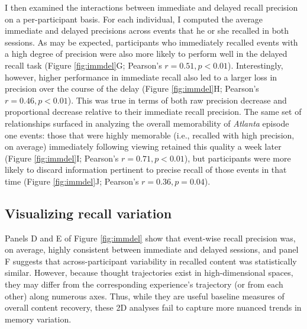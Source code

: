 \documentclass{article}
\begin{document}
I then examined the interactions between immediate and delayed recall precision on a per-participant basis.  For each individual, I computed the average immediate and delayed precisions across events that he or she recalled in both sessions.  As may be expected, participants who immediately recalled events with a high degree of precision were also more likely to perform well in the delayed recall task (Figure \ref{fig:immdel}G; Pearson's $r=0.51, p<0.01$).  Interestingly, however, higher performance in immediate recall also led to a larger loss in precision over the course of the delay (Figure \ref{fig:immdel}H; Pearson's $r=0.46, p<0.01$).  This was true in terms of both raw precision decrease and proportional decrease relative to their immediate recall precision.  The same set of relationships surfaced in analyzing the overall memorability of \textit{Atlanta} episode one events: those that were highly memorable (i.e., recalled with high precision, on average) immediately following viewing retained this quality a week later (Figure \ref{fig:immdel}I; Pearson's $r=0.71, p<0.01$), but participants were more likely to discard information pertinent to precise recall of those events in that time (Figure \ref{fig:immdel}J; Pearson's $r=0.36, p=0.04$).
\FloatBarrier


\subsection*{Visualizing recall variation}\label{sec:trajresults}
Panels D and E of Figure \ref{fig:immdel} show that event-wise recall precision was, on average, highly consistent between immediate and delayed sessions, and panel F suggests that across-participant variability in recalled content was statistically similar.  However, because thought trajectories exist in high-dimensional spaces, they may differ from the corresponding experience's trajectory (or from each other) along numerous axes.  Thus, while they are useful baseline measures of overall content recovery, these 2D analyses fail to capture more nuanced trends in memory variation.
\end{document}

